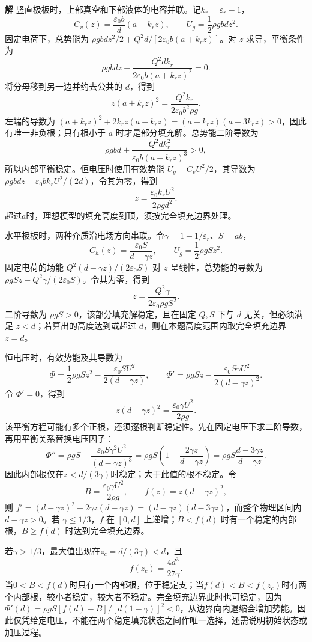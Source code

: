 \documentclass[11pt,openany,fontset=fandol]{ctexbook}
\theoremstyle{definition}\newtheorem{example}{例}[chapter]\newtheorem{exercise}{习题}[chapter]
\newcommand{\SolutionStart}{\par\medskip\ifdim\pagetotal>0pt\ifdim\dimexpr\pagegoal-\pagetotal\relax<3\baselineskip\newpage\fi\fi\noindent\textbf{解}\quad\ignorespaces}
\newenvironment{solution}{\SolutionStart}{\par\medskip}
\begin{document}
\begin{solution}
竖直极板时，上部真空和下部液体的电容并联。记$k_r=\varepsilon_r-1$，
\[
 C_v(z)=\frac{\varepsilon_0b}{d}(a+k_rz),\qquad
 U_g=\frac12\rho gbdz^2.
\]
固定电荷下，总势能为 $\rho gbdz^2/2+Q^2d/[2\varepsilon_0b(a+k_rz)]$。对 $z$ 求导，平衡条件为
\[
\rho gbdz-\frac{Q^2dk_r}{2\varepsilon_0b(a+k_rz)^2}=0.
\]
将分母移到另一边并约去公共的 $d$，得到
\[
 \boxed{z(a+k_rz)^2=\frac{Q^2k_r}{2\varepsilon_0b^2\rho g}}.
\]
左端的导数为 $(a+k_rz)^2+2k_rz(a+k_rz)=(a+k_rz)(a+3k_rz)>0$，因此有唯一非负根；只有根小于 $a$ 时才是部分填充解。总势能二阶导数为
\[
\rho gbd+\frac{Q^2dk_r^2}{\varepsilon_0b(a+k_rz)^3}>0,
\]
所以内部平衡稳定。恒电压时使用有效势能 $U_g-C_vU^2/2$，其导数为 $\rho gbdz-\varepsilon_0bk_rU^2/(2d)$，令其为零，得到
\[
 \boxed{z=\frac{\varepsilon_0k_rU^2}{2\rho gd^2}}.
\]
超过$a$时，理想模型的填充高度到顶，须按完全填充边界处理。

水平极板时，两种介质沿电场方向串联。令$\gamma=1-1/\varepsilon_r$、$S=ab$，
\[
 C_h(z)=\frac{\varepsilon_0S}{d-\gamma z},\qquad
 U_g=\frac12\rho gSz^2.
\]
固定电荷的场能 $Q^2(d-\gamma z)/(2\varepsilon_0S)$ 对 $z$ 呈线性，总势能的导数为 $\rho gSz-Q^2\gamma/(2\varepsilon_0S)$。令其为零，得到
\[
 \boxed{z=\frac{Q^2\gamma}{2\varepsilon_0\rho gS^2}}.
\]
二阶导数为 $\rho gS>0$，该部分填充解稳定，且在固定 $Q,S$ 下与 $d$ 无关，但必须满足 $z<d$；若算出的高度达到或超过 $d$，则在本题高度范围内取完全填充边界 $z=d$。

恒电压时，有效势能及其导数为
\[
\Phi=\frac12\rho gSz^2-\frac{\varepsilon_0SU^2}{2(d-\gamma z)},
\qquad
\Phi'=\rho gSz-\frac{\varepsilon_0S\gamma U^2}{2(d-\gamma z)^2}.
\]
令 $\Phi'=0$，得到
\[
 \boxed{z(d-\gamma z)^2=\frac{\varepsilon_0\gamma U^2}{2\rho g}}.
\]
该平衡方程可能有多个正根，还须逐根判断稳定性。先在固定电压下求二阶导数，再用平衡关系替换电压因子：
\[
\Phi''=\rho gS-\frac{\varepsilon_0S\gamma^2U^2}{(d-\gamma z)^3}
=\rho gS\left(1-\frac{2\gamma z}{d-\gamma z}\right)
=\rho gS\frac{d-3\gamma z}{d-\gamma z}.
\]
因此内部根仅在$z<d/(3\gamma)$时稳定；大于此值的根不稳定。令
\[
B=\frac{\varepsilon_0\gamma U^2}{2\rho g},\qquad
f(z)=z(d-\gamma z)^2,
\]
则 $f'=(d-\gamma z)^2-2\gamma z(d-\gamma z)=(d-\gamma z)(d-3\gamma z)$，而整个物理区间内 $d-\gamma z>0$。若 $\gamma\le1/3$，$f$ 在 $[0,d]$ 上递增；$B<f(d)$ 时有一个稳定的内部根，$B\ge f(d)$ 时达到完全填充边界。

若$\gamma>1/3$，最大值出现在$z_c=d/(3\gamma)<d$，且
\[
f(z_c)=\frac{4d^3}{27\gamma}.
\]
当$0<B<f(d)$时只有一个内部根，位于稳定支；当$f(d)<B<f(z_c)$时有两个内部根，较小者稳定，较大者不稳定。完全填充边界此时也可稳定，因为
$\Phi'(d)=\rho gS[f(d)-B]/[d(1-\gamma)]^2<0$，从边界向内退缩会增加势能。因此仅凭给定电压，不能在两个稳定填充状态之间作唯一选择，还需说明初始状态或加压过程。


\end{solution}
\end{document}
